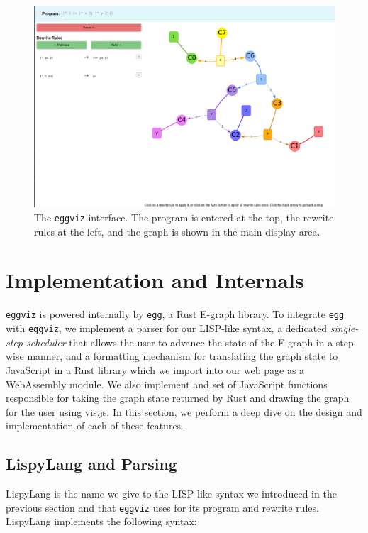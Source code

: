 \documentclass[letterpaper,twocolumn,11pt]{article}
\begin{document}
\begin{figure}
    \centering
    \includegraphics[width=\textwidth]{interface.png}
    \caption{The \texttt{eggviz} interface. The program is entered at the top,
      the rewrite rules at the left, and the graph is shown in the main display
      area.}
    \label{fig:my_label}
\end{figure}

\section{Implementation and Internals}

\texttt{eggviz} is powered internally by \texttt{egg}, a Rust E-graph
library\cite{egg}. To integrate \texttt{egg} with \texttt{eggviz}, we implement
a parser for our LISP-like syntax, a dedicated \textit{single-step scheduler}
that allows the user to advance the state of the E-graph in a step-wise manner,
and a formatting mechanism for translating the graph state to JavaScript in a
Rust library which we import into our web page as a WebAssembly module. We also
implement and set of JavaScript functions responsible for taking the graph state
returned by Rust and drawing the graph for the user using vis.js. In this
section, we perform a deep dive on the design and implementation of each of
these features.

\subsection{LispyLang and Parsing}
\label{sec:lispylang}

LispyLang is the name we give to the LISP-like syntax we introduced in the
previous section and that \texttt{eggviz} uses for its program and rewrite
rules. LispyLang implements the following syntax:
\end{document}
